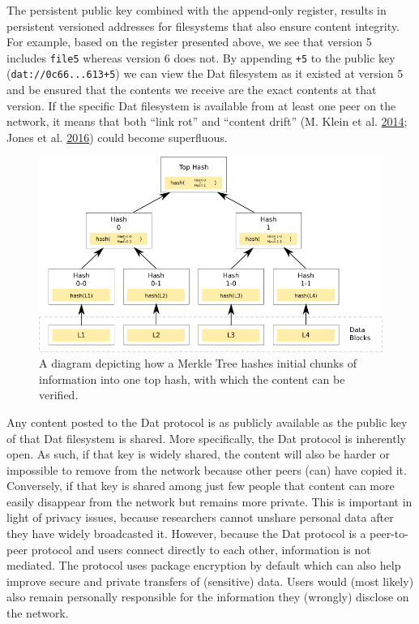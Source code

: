 \documentclass[a5paper]{book}
\begin{document}
The persistent public key combined with the append-only register,
results in persistent versioned addresses for filesystems that also
ensure content integrity. For example, based on the register presented
above, we see that version 5 includes \texttt{file5} whereas version 6
does not. By appending \texttt{+5} to the public key
(\texttt{dat://0c66...613+5}) we can view the Dat filesystem as it
existed at version 5 and be ensured that the contents we receive are the
exact contents at that version. If the specific Dat filesystem is
available from at least one peer on the network, it means that both
\enquote{link rot} and \enquote{content drift} (M. Klein et al.
\protect\hyperlink{ref-doi:10.1371ux2fjournal.pone.0115253}{2014}; Jones
et al.
\protect\hyperlink{ref-doi:10.1371ux2fjournal.pone.0167475}{2016}) could
become superfluous.

\begin{figure}[h]

{\centering \includegraphics[width=1\linewidth]{assets/figures/datcom-fig2} 

}

\caption{A diagram depicting how a Merkle Tree hashes initial chunks of information into one top hash, with which the content can be verified.}\label{fig:datcom-fig2}
\end{figure}

Any content posted to the Dat protocol is as publicly available as the
public key of that Dat filesystem is shared. More specifically, the Dat
protocol is inherently open. As such, if that key is widely shared, the
content will also be harder or impossible to remove from the network
because other peers (can) have copied it. Conversely, if that key is
shared among just few people that content can more easily disappear from
the network but remains more private. This is important in light of
privacy issues, because researchers cannot unshare personal data after
they have widely broadcasted it. However, because the Dat protocol is a
peer-to-peer protocol and users connect directly to each other,
information is not mediated. The protocol uses package encryption by
default which can also help improve secure and private transfers of
(sensitive) data. Users would (most likely) also remain personally
responsible for the information they (wrongly) disclose on the network.
\end{document}
